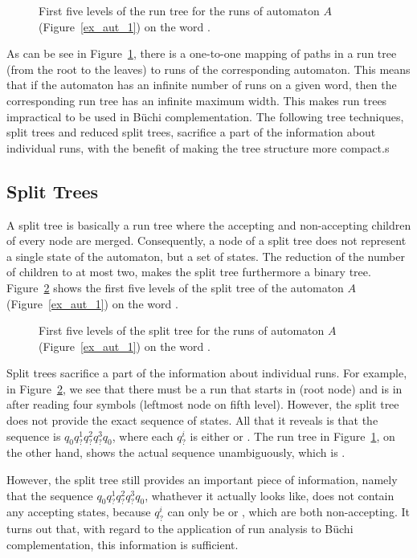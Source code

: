 \begin{figure}[htb]
\centering
\RunTree
\caption{First five levels of the run tree for the runs of automaton $A$ (Figure~\ref{ex_aut_1}) on the word \aom.}
\label{run_tree}
\end{figure}

As can be see in Figure~\ref{run_tree}, there is a one-to-one mapping of paths in a run tree (from the root to the leaves) to runs of the corresponding automaton. This means that if the automaton has an infinite number of runs on a given word, then the corresponding run tree has an infinite maximum width. This makes run trees impractical to be used in Büchi complementation. The following tree techniques, split trees and reduced split trees, sacrifice a part of the information about individual runs, with the benefit of making the tree structure more compact.s

\subsection{Split Trees}
\label{2_split_trees}
A split tree is basically a run tree where the accepting and non-accepting children of every node are merged. Consequently, a node of a split tree does not represent a single state of the automaton, but a set of states. The reduction of the number of children to at most two, makes the split tree furthermore a binary tree. Figure~\ref{split_tree} shows the first five levels of the split tree of the automaton $A$ (Figure~\ref{ex_aut_1}) on the word \aom.

\begin{figure}
\centering
\SplitTreeRightLeft
\caption{First five levels of the split tree for the runs of automaton $A$ (Figure~\ref{ex_aut_1}) on the word \aom.}
\label{split_tree}
\end{figure}

Split trees sacrifice a part of the information about individual runs. For example, in Figure~\ref{split_tree}, we see that there must be a run that starts in  (root node) and is in  after reading four symbols (leftmost node on fifth level). However, the split tree does not provide the exact sequence of states. All that it reveals is that the sequence is $q_{0}q^1_?q^2_?q^3_?q_{0}$, where each $q^i_?$ is either  or . The run tree in Figure~\ref{run_tree}, on the other hand, shows the actual sequence unambiguously, which is .

However, the split tree still provides an important piece of information, namely that the sequence $q_{0}q^1_?q^2_?q^3_?q_{0}$, whathever it actually looks like, does not contain any accepting states, because $q^i_?$ can only be  or , which are both non-accepting. It turns out that, with regard to the application of run analysis to Büchi complementation, this information is sufficient.


